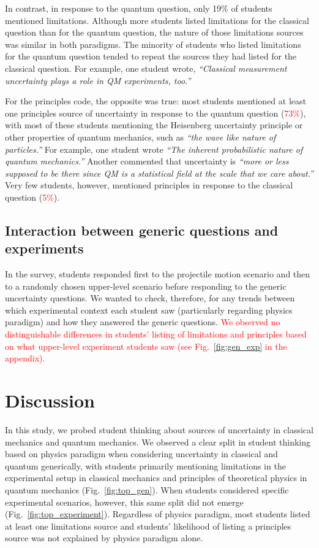 \documentclass[english,aps,prstper,reprint,showpacs,longbibliography,superscriptaddress,nofootinbib]{revtex4-2}
\begin{document}
In contrast, in response to the quantum question, only 19\% of students mentioned limitations. Although more students listed limitations for the classical question than for the quantum question, the nature of those limitations sources was similar in both paradigms. The minority of students who listed limitations for the quantum question tended to repeat the sources they had listed for the classical question. For example, one student wrote, \textit{``Classical measurement uncertainty plays a role in QM experiments, too.''}

For the principles code, the opposite was true: most students mentioned at least one principles source of uncertainty in response to the quantum question (\textcolor{red}{73\%}), with most of these students mentioning the Heisenberg uncertainty principle or other properties of quantum mechanics, such as \textit{``the wave like nature of particles.''} For example, one student wrote \textit{``The inherent probabilistic nature of quantum mechanics.''} Another commented that uncertainty is \textit{``more or less supposed to be there since QM is a statistical field at the scale that we care about.''} Very few students, however, mentioned principles in response to the classical question (\textcolor{red}{5\%}).

\subsection{Interaction between generic questions and experiments}
\label{sec:priming}

In the survey, students responded first to the projectile motion scenario and then to a randomly chosen upper-level scenario before responding to the generic uncertainty questions. We wanted to check, therefore, for any trends between which experimental context each student saw (particularly regarding physics paradigm) and how they answered the generic questions. \textcolor{red}{We observed no distinguishable differences in students' listing of limitations and principles based on what upper-level experiment students saw (see Fig.~\ref{fig:gen_exp} in the appendix).}


\section{Discussion}

In this study, we probed student thinking about sources of uncertainty in classical mechanics and quantum mechanics. We observed a clear split in student thinking based on physics paradigm when considering uncertainty in classical and quantum generically, with students primarily mentioning limitations in the experimental setup in classical mechanics and principles of theoretical physics in quantum mechanics (Fig.~\ref{fig:top_gen}). When students considered specific experimental scenarios, however, this same split did not emerge (Fig.~\ref{fig:top_experiment}). Regardless of physics paradigm, most students listed at least one limitations source and students' likelihood of listing a principles source was not explained by physics paradigm alone.
\end{document}

